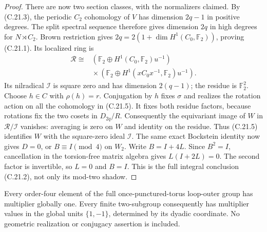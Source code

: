 \begin{proof}
There are now two section classes, with the
normalizers claimed.  By (C.21.3), the periodic
$C_2$ cohomology of $V$ has dimension $2q-1$ in
positive degrees.  The split spectral sequence
therefore gives dimension $2q$ in high degrees
for $N\rtimes C_2$.  Brown restriction gives
$2q=2(1+\dim H^1(C_0,\mathbb F_2))$, proving
(C.21.1).  Its localized ring is
\[
\begin{split}
 \mathcal R\cong&
 (\mathbb F_2\oplus H^1(C_0,\mathbb F_2)u^{-1})\\
 &{}\times
 (\mathbb F_2\oplus H^1(xC_0x^{-1},\mathbb F_2)u^{-1}).
\end{split}
\]
Its nilradical $\mathcal I$ is square zero and
has dimension $2(q-1)$; the residue is
$\mathbb F_2^2$.  Choose $h\in C$ with $\rho(h)=r$.
Conjugation by $h$ fixes $\sigma$ and realizes
the rotation action on all the cohomology in
(C.21.5).  It fixes both residue factors, because
rotations fix the two cosets in $D_{2q}/R$.
Consequently the equivariant image of $W$ in
$\mathcal R/\mathcal I$ vanishes: averaging is zero
on $W$ and identity on the residue.  Thus (C.21.5)
identifies $W$ with the square-zero ideal
$\mathcal I$.  The same exact Bockstein identity
now gives $D=0$, or $B\equiv I\pmod4$ on $W_2$.
Write $B=I+4L$.  Since $B^2=I$, cancellation in
the torsion-free matrix algebra gives
$L(I+2L)=0$.  The second factor is invertible,
so $L=0$ and $B=I$.  This is the full integral
conclusion (C.21.2), not only its mod-two shadow.
\end{proof}

Every order-four element of the full once-punctured-torus
loop-outer group has multiplier globally one.  Every
finite two-subgroup consequently has multiplier values
in the global units $\{1,-1\}$, determined by its
dyadic coordinate.  No geometric realization or
conjugacy assertion is included.

